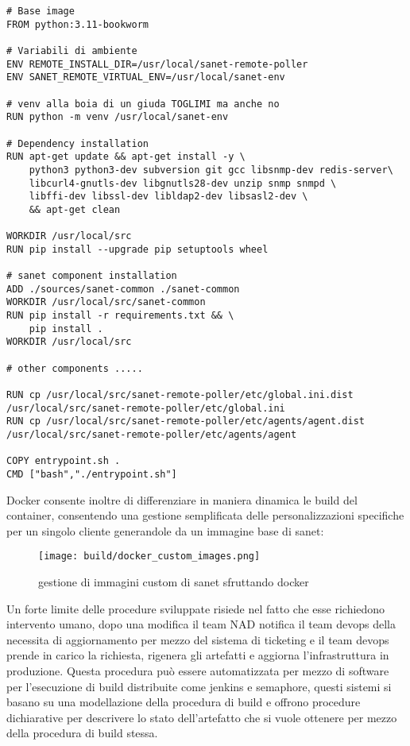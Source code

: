 \begin{lstlisting}[]
# Base image
FROM python:3.11-bookworm

# Variabili di ambiente
ENV REMOTE_INSTALL_DIR=/usr/local/sanet-remote-poller
ENV SANET_REMOTE_VIRTUAL_ENV=/usr/local/sanet-env

# venv alla boia di un giuda TOGLIMI ma anche no
RUN python -m venv /usr/local/sanet-env

# Dependency installation
RUN apt-get update && apt-get install -y \
    python3 python3-dev subversion git gcc libsnmp-dev redis-server\
    libcurl4-gnutls-dev libgnutls28-dev unzip snmp snmpd \
    libffi-dev libssl-dev libldap2-dev libsasl2-dev \
    && apt-get clean

WORKDIR /usr/local/src
RUN pip install --upgrade pip setuptools wheel

# sanet component installation
ADD ./sources/sanet-common ./sanet-common
WORKDIR /usr/local/src/sanet-common
RUN pip install -r requirements.txt && \
    pip install .
WORKDIR /usr/local/src

# other components .....

RUN cp /usr/local/src/sanet-remote-poller/etc/global.ini.dist /usr/local/src/sanet-remote-poller/etc/global.ini
RUN cp /usr/local/src/sanet-remote-poller/etc/agents/agent.dist /usr/local/src/sanet-remote-poller/etc/agents/agent

COPY entrypoint.sh .
CMD ["bash","./entrypoint.sh"]
\end{lstlisting}

Docker consente inoltre di differenziare in maniera dinamica le build del container, consentendo una gestione semplificata delle personalizzazioni specifiche per un singolo cliente generandole da un immagine base di sanet:

\begin{figure}[H]
    \centering
    \texttt{[image: build/docker\_custom\_images.png]}
    \caption{gestione di immagini custom di sanet sfruttando docker}
    \label{fig:docker_custom_images}
\end{figure}


Un forte limite delle procedure sviluppate risiede nel fatto che esse richiedono intervento umano, dopo una modifica il team NAD notifica il team devops della necessita di aggiornamento per mezzo del sistema di ticketing e il team devops prende in carico la richiesta, rigenera gli artefatti e aggiorna l'infrastruttura in produzione.
Questa procedura può essere automatizzata per mezzo di software per l'esecuzione di build distribuite come jenkins\cite{jenkins} e semaphore, questi sistemi si basano su una modellazione della procedura di build e offrono procedure dichiarative per descrivere lo stato dell'artefatto che si vuole ottenere per mezzo della procedura di build stessa.

